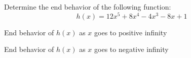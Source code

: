 \documentclass{ximera}
\author{David Kish}
\begin{document}
Determine the end behavior of the following function:
\[
h(x)=12x^5+8x^4-4x^3-8x+1
\]
\begin{exercise}
End behavior of $h(x)$ as $x$ goes to positive infinity
\begin{multipleChoice}
\end{multipleChoice}
\end{exercise}
\begin{exercise}
End behavior of $h(x)$ as $x$ goes to negative infinity
\begin{multipleChoice}
\end{multipleChoice}
\end{exercise}
\end{document}
